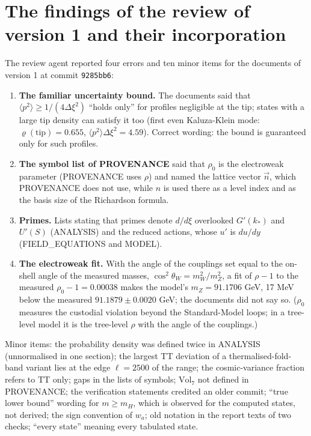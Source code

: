 \documentclass[
  10pt,
]{article}
\providecommand{\tightlist}{%
  \setlength{\itemsep}{0pt}\setlength{\parskip}{0pt}}
\begin{document}
\hypertarget{the-findings-of-the-review-of-version-1-and-their-incorporation}{%
\section{The findings of the review of version 1 and their
incorporation}\label{the-findings-of-the-review-of-version-1-and-their-incorporation}}

The review agent reported four errors and ten minor items for the
documents of version 1 at commit \texttt{9285bb6}:

\begin{enumerate}
\def\labelenumi{\arabic{enumi}.}
\tightlist
\item
  \textbf{The familiar uncertainty bound.} The documents said that
  \(\langle p^2\rangle \ge 1/(4\Delta\xi^2)\) ``holds only'' for
  profiles negligible at the tip; states with a large tip density can
  satisfy it too (first even Kaluza-Klein mode:
  \(\varrho(\text{tip}) = 0.655\),
  \(\langle p^2\rangle\Delta\xi^2 = 4.59\)). Correct wording: the bound
  is guaranteed only for such profiles.
\item
  \textbf{The symbol list of PROVENANCE} said that \(\rho_0\) is the
  electroweak parameter (PROVENANCE uses \(\rho\)) and named the lattice
  vector \(\vec n\), which PROVENANCE does not use, while \(n\) is used
  there as a level index and as the basis size of the Richardson
  formula.
\item
  \textbf{Primes.} Lists stating that primes denote \(d/d\xi\)
  overlooked \(G'(k_*)\) and \(U'(S)\) (ANALYSIS) and the reduced
  actions, whose \(u'\) is \(du/dy\) (FIELD\_EQUATIONS and MODEL).
\item
  \textbf{The electroweak fit.} With the angle of the couplings set
  equal to the on-shell angle of the measured masses,
  \(\cos^2\theta_W = m_W^2/m_Z^2\), a fit of \(\rho - 1\) to the
  measured \(\rho_0 - 1 = 0.00038\) makes the model's \(m_Z = 91.1706\)
  GeV, 17 MeV below the measured \(91.1879 \pm 0.0020\) GeV; the
  documents did not say so. (\(\rho_0\) measures the custodial violation
  beyond the Standard-Model loops; in a tree-level model it is the
  tree-level \(\rho\) with the angle of the couplings.)
\end{enumerate}

Minor items: the probability density was defined twice in ANALYSIS
(unnormalised in one section); the largest TT deviation of a
thermalised-fold-band variant lies at the edge \(\ell = 2500\) of the
range; the cosmic-variance fraction refers to TT only; gaps in the lists
of symbols; \(\mathrm{Vol}_7\) not defined in PROVENANCE; the
verification statements credited an older commit; ``true lower bound''
wording for \(m \ge m_H\), which is observed for the computed states,
not derived; the sign convention of \(w_a\); old notation in the report
texts of two checks; ``every state'' meaning every tabulated state.
\end{document}
